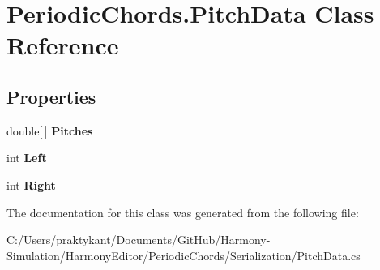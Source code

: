 \hypertarget{class_periodic_chords_1_1_pitch_data}{\section{Periodic\+Chords.\+Pitch\+Data Class Reference}
\label{class_periodic_chords_1_1_pitch_data}
}
\subsection*{Properties}
\begin{DoxyCompactItemize}
\item 
\hypertarget{class_periodic_chords_1_1_pitch_data_abe473d97cf439c72fd7a40198f6f01b4}{double\mbox{[}$\,$\mbox{]} {\bfseries Pitches}}\label{class_periodic_chords_1_1_pitch_data_abe473d97cf439c72fd7a40198f6f01b4}

\item 
\hypertarget{class_periodic_chords_1_1_pitch_data_aaaa5e93ce6101b04692c64359396cbe3}{int {\bfseries Left}}\label{class_periodic_chords_1_1_pitch_data_aaaa5e93ce6101b04692c64359396cbe3}

\item 
\hypertarget{class_periodic_chords_1_1_pitch_data_afc7f131d95a1eda021ebb3a562782f4c}{int {\bfseries Right}}\label{class_periodic_chords_1_1_pitch_data_afc7f131d95a1eda021ebb3a562782f4c}

\end{DoxyCompactItemize}


The documentation for this class was generated from the following file\+:\begin{DoxyCompactItemize}
\item 
C\+:/\+Users/praktykant/\+Documents/\+Git\+Hub/\+Harmony-\/\+Simulation/\+Harmony\+Editor/\+Periodic\+Chords/\+Serialization/Pitch\+Data.\+cs\end{DoxyCompactItemize}
